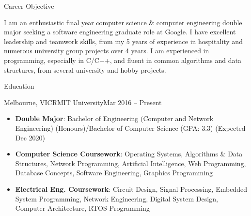 \documentclass[]{mcdowellcv}
\begin{document}
	\makeheader
	
	\begin{cvsection}{Career Objective}
		\begin{cvsubsection}{}{}{}
			I am an enthusiastic final year computer science \& computer engineering double major seeking a software engineering graduate role at Google.
			I have excellent leadership and teamwork skills, from my 5 years of experience in hospitality and numerous university group projects over 4 years.
			I am experienced in programming, especially in C/C++, and fluent in common algorithms and data structures, from several university and hobby projects.
		\end{cvsubsection}
	\end{cvsection}

	\begin{cvsection}{Education}
		\begin{cvsubsection}{Melbourne, VIC}{RMIT University}{Mar 2016 -- Present}
			\begin{itemize}
				\item \textbf{Double Major}: Bachelor of Engineering (Computer and Network Engineering) (Honours)/Bachelor of Computer Science (GPA: 3.3) (Expected Dec 2020) 
				\item \textbf{Computer Science Coursework}: Operating Systems, Algorithms \& Data Structures, Network Programming, Artificial Intelligence, Web Programming, Database Concepts, Software Engineering, Graphics Programming
				\item \textbf{Electrical Eng. Coursework}: Circuit Design, Signal Processing, Embedded System Programming, Network Engineering, Digital System Design, Computer Architecture, RTOS Programming
			\end{itemize}
		\end{cvsubsection}
	\end{cvsection}
\end{document}
